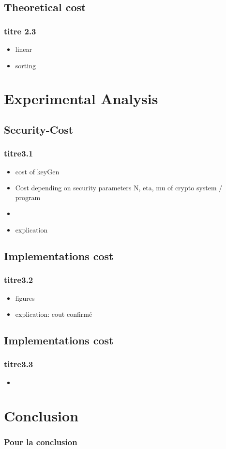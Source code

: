 \documentclass{beamer}
\begin{document}
\subsection{Theoretical cost}

\begin{frame} 
 \frametitle{titre 2.3}
  \begin{itemize}
  \item linear
  \item sorting
  \end{itemize}
\end{frame}

\section[Experimental Analysis]{Experimental Analysis}

\subsection{Security-Cost}

\begin{frame} \frametitle{titre3.1}
  \begin{itemize}
  \item cost of keyGen
  \item Cost depending on security parameters N, eta, mu of crypto system / program
  \item {}
  \item explication
  \end{itemize}
\end{frame}

\subsection{Implementations cost}

\begin{frame} \frametitle{titre3.2}
  \begin{itemize}
  \item figures
  \item explication: cout confirmé
  \end{itemize}
\end{frame}

\subsection{Implementations cost}

\begin{frame} \frametitle{titre3.3}
  \begin{itemize}
  \item {}
  \end{itemize}
\end{frame}

\section[Conclusion]{Conclusion}

\begin{frame}
  \frametitle{Pour la conclusion}
\end{frame}
\end{document}
